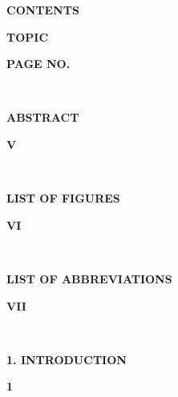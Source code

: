 \documentclass[a4paper,12pt, English]{article}
\newcommand\tab[1][1cm]{\hspace*{#1}}
\begin{document}
\newpage
\begin{titlepage}

\begin{center}
    \textbf{\Large CONTENTS}\\
\end{center}
\vspace*{0.25in}

\noindent 
{\begin{normalsize}
\textbf{\tab TOPIC}
\end{normalsize}
}
\hfill 
{
\begin{normalsize}
\textbf{PAGE NO.}
\end{normalsize}
}
\\
\noindent 
{\begin{large}
\textbf{\tab ABSTRACT}
\end{large}
}
{
\begin{normalsize}
\tab\hspace*{10.3cm}\textbf{V}
\end{normalsize}
}\\
\noindent 
{\begin{large}
\textbf{ \tab LIST OF FIGURES}
\end{large}
}
{
\begin{normalsize}
\hspace*{9.7cm}\textbf{VI}
\end{normalsize}
}\\
\noindent 
{\begin{large}
\textbf{ \tab LIST OF ABBREVIATIONS}
\end{large}
} 
{
\begin{normalsize}
\hspace{7.8cm}\textbf{VII}
\end{normalsize}
}\\
\noindent 
{\begin{large}
\textbf{\tab 1. INTRODUCTION}
\end{large}
} 
{
\begin{large}
\hspace{9.7cm}\textbf{1}
\end{large}
}
 

\end{titlepage}
\end{document}
